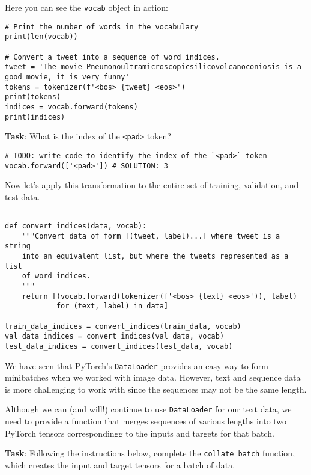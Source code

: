 \documentclass[
  letterpaper,
  DIV=11,
  numbers=noendperiod]{scrartcl}
\begin{document}
Here you can see the \texttt{vocab} object in action:

\begin{verbatim}
# Print the number of words in the vocabulary
print(len(vocab))

# Convert a tweet into a sequence of word indices.
tweet = 'The movie Pneumonoultramicroscopicsilicovolcanoconiosis is a good movie, it is very funny'
tokens = tokenizer(f'<bos> {tweet} <eos>')
print(tokens)
indices = vocab.forward(tokens)
print(indices)
\end{verbatim}

\textbf{Task}: What is the index of the
\texttt{\textless{}pad\textgreater{}} token?

\begin{verbatim}
# TODO: write code to identify the index of the `<pad>` token
vocab.forward(['<pad>']) # SOLUTION: 3
\end{verbatim}

Now let's apply this transformation to the entire set of training,
validation, and test data.

\begin{verbatim}

def convert_indices(data, vocab):
    """Convert data of form [(tweet, label)...] where tweet is a string
    into an equivalent list, but where the tweets represented as a list
    of word indices.
    """
    return [(vocab.forward(tokenizer(f'<bos> {text} <eos>')), label)
            for (text, label) in data]

train_data_indices = convert_indices(train_data, vocab)
val_data_indices = convert_indices(val_data, vocab)
test_data_indices = convert_indices(test_data, vocab)
\end{verbatim}

We have seen that PyTorch's \texttt{DataLoader} provides an easy way to
form minibatches when we worked with image data. However, text and
sequence data is more challenging to work with since the sequences may
not be the same length.

Although we can (and will!) continue to use \texttt{DataLoader} for our
text data, we need to provide a function that merges sequences of
various lengths into two PyTorch tensors correspondingg to the inputs
and targets for that batch.

\textbf{Task}: Following the instructions below, complete the
\texttt{collate\_batch} function, which creates the input and target
tensors for a batch of data.
\end{document}

